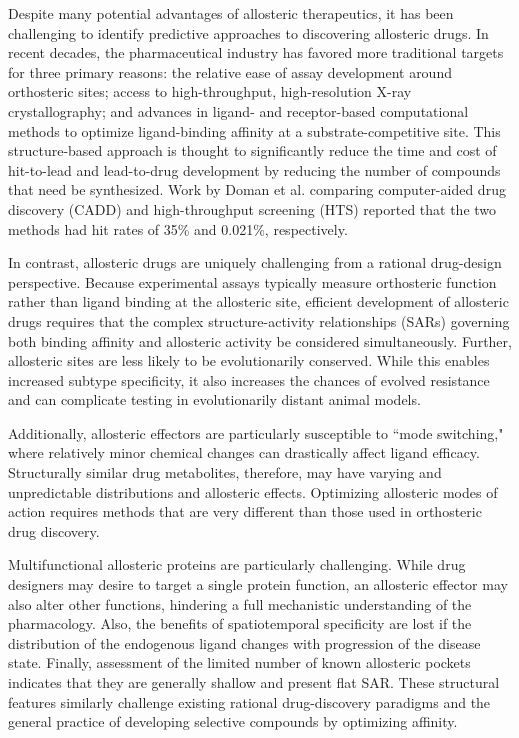 \par Despite many potential advantages of allosteric therapeutics, it has been challenging to identify predictive approaches to discovering allosteric drugs. In recent decades, the pharmaceutical industry has favored more traditional targets for three primary reasons: the relative ease of assay development around orthosteric sites; access to high-throughput, high-resolution X-ray crystallography; and advances in ligand- and receptor-based computational methods to optimize ligand-binding affinity at a substrate-competitive site. This structure-based approach is thought to significantly reduce the time and cost of hit-to-lead and lead-to-drug development by reducing the number of compounds that need be synthesized.\cite{Muchmore2003a,Jorgensen2004} Work by Doman et al. comparing computer-aided drug discovery (CADD) and high-throughput screening (HTS) reported that the two methods had hit rates of 35\% and 0.021\%, respectively.\cite{Doman2002a}
\par In contrast, allosteric drugs are uniquely challenging from a rational drug-design perspective. Because experimental assays typically measure orthosteric function rather than ligand binding at the allosteric site, efficient development of allosteric drugs requires that the complex structure-activity relationships (SARs) governing both binding affinity and allosteric activity be considered simultaneously.\cite{Nussinov2012a,Wenthur2014,Wood2011a} Further, allosteric sites are less likely to be evolutionarily conserved. While this enables increased subtype specificity, it also increases the chances of evolved resistance\cite{Nussinov2012a,Gunasekaran2004a,Wenthur2014} and can complicate testing in evolutionarily distant animal models.\cite{Wenthur2014}
\par Additionally, allosteric effectors are particularly susceptible to ``mode switching," where relatively minor chemical changes can drastically affect ligand efficacy.\cite{Wenthur2014,Wood2011a} Structurally similar drug metabolites, therefore, may have varying and unpredictable distributions and allosteric effects.\cite{Wenthur2014, Wood2011a} Optimizing allosteric modes of action requires methods that are very different than those used in orthosteric drug discovery.\cite{Nussinov2012a}
\par Multifunctional allosteric proteins are particularly challenging. While drug designers may desire to target a single protein function, an allosteric effector may also alter other functions, hindering a full mechanistic understanding of the pharmacology.\cite{Wenthur2014} Also, the benefits of spatiotemporal specificity are lost if the distribution of the endogenous ligand changes with progression of the disease state.\cite{Wenthur2014} Finally, assessment of the limited number of known allosteric pockets indicates that they are generally shallow\cite{Nussinov2012a} and present flat SAR.\cite{Wenthur2014} These structural features similarly challenge existing rational drug-discovery paradigms and the general practice of developing selective compounds by optimizing affinity.
